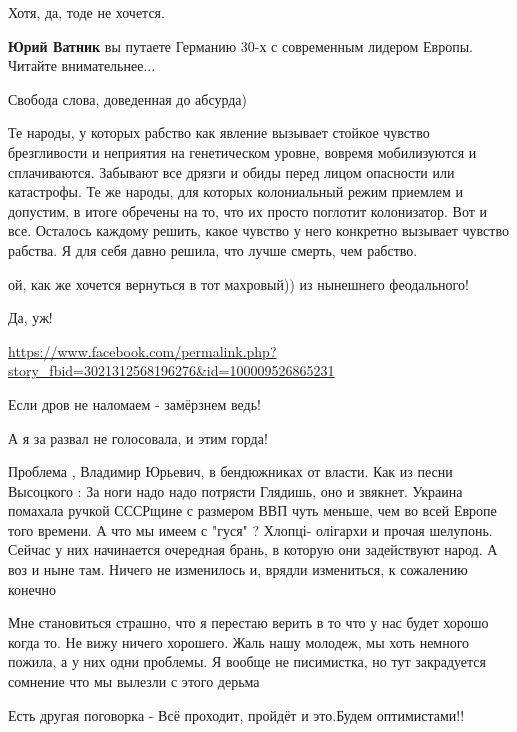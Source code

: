 \begin{itemize}
Хотя, да, тоде не хочется.

\begin{itemize} %
\textbf{Юрий Ватник} вы путаете Германию 30-х с современным лидером Европы. Читайте внимательнее...
\end{itemize} %

Свобода слова, доведенная до абсурда)


Те народы, у которых рабство как явление вызывает стойкое чувство брезгливости
и неприятия на генетическом уровне, вовремя мобилизуются и сплачиваются.
Забывают все дрязги и обиды перед лицом опасности или катастрофы. Те же народы,
для которых колониальный режим приемлем и допустим, в итоге обречены на то, что
их просто поглотит колонизатор. Вот и все. Осталось каждому решить, какое
чувство у него конкретно вызывает чувство рабства. Я для себя давно решила, что
лучше смерть, чем рабство.


ой, как же хочется вернуться в тот махровый)) из нынешнего феодального!

Да, уж!


\url{https://www.facebook.com/permalink.php?story_fbid=3021312568196276&id=100009526865231}

Если дров не наломаем - замёрзнем ведь!

А я за развал не голосовала, и этим горда!


Проблема , Владимир Юрьевич, в бендюжниках от власти. Как из песни Высоцкого :
За ноги надо надо потрясти
Глядишь, оно и звякнет.
Украина помахала ручкой СССРщине с размером ВВП чуть меньше, чем во всей Европе того времени.
А что мы имеем с "гуся" ?
Хлопці- олігархи и прочая шелупонь. Сейчас у них начинается очередная брань, в которую они задействуют народ.
А воз и ныне там.
Ничего не изменилось и, врядли измениться, к сожалению конечно


Мне становиться страшно, что я перестаю верить в то что у нас будет хорошо
когда то. Не вижу ничего хорошего. Жаль нашу молодеж, мы хоть немного пожила, а
у них одни проблемы. Я вообще не писимистка, но тут закрадуется сомнение что мы
вылезли с этого дерьма

Есть другая поговорка - Всё проходит, пройдёт и это.Будем оптимистами!!


\end{itemize}
